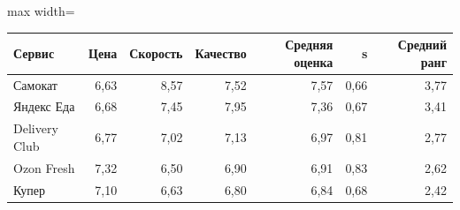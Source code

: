 {%
\small
\setlength{\tabcolsep}{3.0pt}
\renewcommand{\arraystretch}{1.12}
\begin{adjustbox}{max width=\textwidth}
\begin{tabular}{lrrrrrr}
\toprule
Сервис & Цена & Скорость & Качество & Средняя оценка & s & Средний ранг \\
\midrule
Самокат & 6,63 & 8,57 & 7,52 & 7,57 & 0,66 & 3,77 \\
Яндекс Еда & 6,68 & 7,45 & 7,95 & 7,36 & 0,67 & 3,41 \\
Delivery Club & 6,77 & 7,02 & 7,13 & 6,97 & 0,81 & 2,77 \\
Ozon Fresh & 7,32 & 6,50 & 6,90 & 6,91 & 0,83 & 2,62 \\
Купер & 7,10 & 6,63 & 6,80 & 6,84 & 0,68 & 2,42 \\
\bottomrule
\end{tabular}
\end{adjustbox}
}